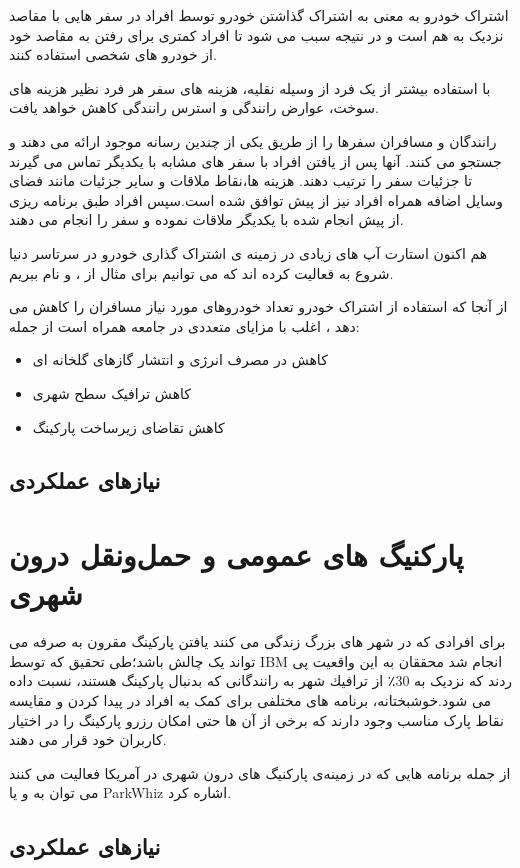 اشتراک خودرو به معنی به اشتراک گذاشتن خودرو توسط افراد در سفر هایی با مقاصد نزدیک به هم است و در نتیجه سبب می شود تا افراد کمتری برای رفتن به مقاصد خود از خودرو های شخصی استفاده کنند.

با استفاده بیشتر از یک فرد از وسیله نقلیه، هزینه های سفر هر فرد نظیر  هزینه های سوخت، عوارض رانندگی و استرس رانندگی کاهش خواهد یافت.

رانندگان و مسافران سفرها را از طریق یکی از چندین رسانه موجود ارائه می دهند و جستجو می کنند. آنها پس از یافتن افراد با سفر های مشابه با یکدیگر تماس می گیرند تا جزئیات سفر را ترتیب دهند. هزینه ها،‌نقاط ملاقات و سایر جزئیات مانند فضای وسایل اضافه همراه افراد نیز از پیش توافق شده است.‌‌سپس افراد طبق برنامه ریزی از پیش انجام شده با یکدیگر ملاقات نموده و سفر را انجام می دهند.

هم اکنون استارت آپ های زیادی در زمینه ی اشتراک گذاری خودرو در سرتاسر دنیا شروع به فعالیت کرده اند که می توانیم برای مثال از  ،  و  نام ببریم.

از آنجا که استفاده از اشتراک خودرو تعداد خودر‌و‌های مورد نیاز مسافران را کاهش می دهد ، اغلب با مزایای متعددی در جامعه همراه است از جمله: 
\begin{itemize}
\item
کاهش در مصرف انرژی و انتشار گازهای گلخانه ای
\item
کاهش ترافیک سطح شهری
\item
کاهش تقاضای زیرساخت پارکینگ
\end{itemize}

\subsection{نیازهای عملکردی }

\section{پارکنیگ های عمومی و حمل‌و‌نقل درون شهری}
برای افرادی که در شهر های بزرگ زندگی می کنند یافتن پارکینگ مقرون به صرفه می تواند یک چالش باشد؛طی تحقیق که توسط IBM انجام شد محققان به این واقعیت پی ردند که نزدیک به  30٪ از ترافیك شهر به رانندگانی كه بدنبال پارکینگ هستند، نسبت داده می شود.خوشبختانه، برنامه های مختلفی برای کمک به افراد در پیدا کردن و مقایسه نقاط پارک مناسب وجود دارند که برخی از آن ها حتی امکان رزرو پارکینگ را در اختیار کاربران خود قرار می دهند.

از جمله برنامه هایی که در زمینه‌ی پارکنیگ های درون شهری در آمریکا فعالیت می کنند می توان به  و یا ParkWhiz اشاره کرد.


\subsection{نیازهای عملکردی }


















